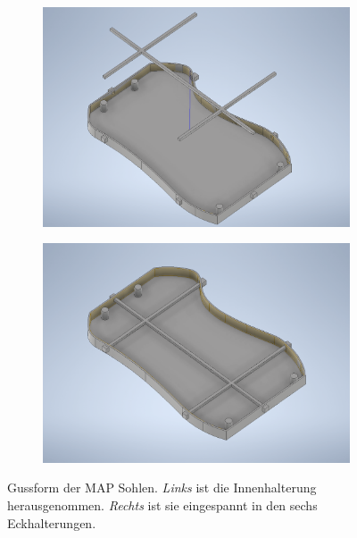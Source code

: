 \begin{figure}[tb]
	\hfill
	\begin{subfigure}[c]{.49\linewidth}
		\centering
		\includegraphics[width=\linewidth]{Bilder/Gussform_Innenteil_verschoben.png}
	\end{subfigure}
	\begin{subfigure}[c]{.49\linewidth}
		\centering
		\includegraphics[width=\linewidth]{Bilder/Gussform.png}		
	\end{subfigure}
	\hfill
	\caption{Gussform der MAP Sohlen. \textit{Links} ist die Innenhalterung herausgenommen. \textit{Rechts} ist sie eingespannt in den sechs Eckhalterungen.}
	\label{Gussform_Inventor}
\end{figure}

